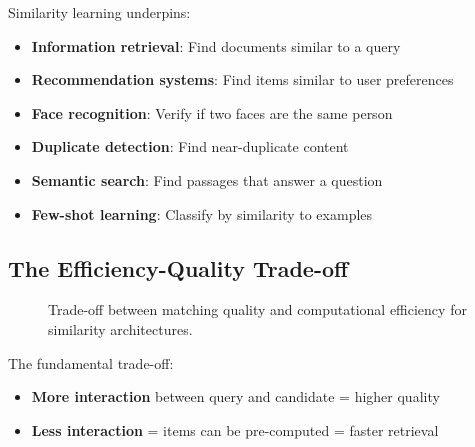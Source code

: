 Similarity learning underpins:
\begin{itemize}
    \item \textbf{Information retrieval}: Find documents similar to a query
    \item \textbf{Recommendation systems}: Find items similar to user preferences
    \item \textbf{Face recognition}: Verify if two faces are the same person
    \item \textbf{Duplicate detection}: Find near-duplicate content
    \item \textbf{Semantic search}: Find passages that answer a question
    \item \textbf{Few-shot learning}: Classify by similarity to examples
\end{itemize}

\subsection{The Efficiency-Quality Trade-off}

\begin{figure}[H]
\centering
{}
\caption{Trade-off between matching quality and computational efficiency for similarity architectures.}
\label{fig:similarity_tradeoff}
\end{figure}

The fundamental trade-off:
\begin{itemize}
    \item \textbf{More interaction} between query and candidate = higher quality
    \item \textbf{Less interaction} = items can be pre-computed = faster retrieval
\end{itemize}

